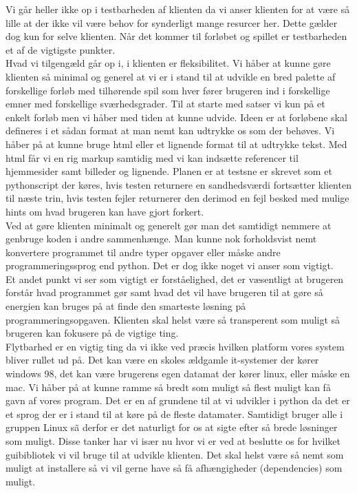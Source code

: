 \documentclass[10pt,a4paper,danish]{article}
\begin{document}
Vi går heller ikke op i testbarheden af klienten da vi anser klienten for at være så lille at der ikke vil være behov for synderligt mange resurcer her. Dette gælder dog kun for selve klienten. Når det kommer til forløbet og spillet er testbarheden et af de vigtigste punkter.
\\

Hvad vi tilgengæld går op i, i klienten er fleksibilitet. Vi håber at kunne gøre klienten så minimal og generel at vi er i stand til at udvikle en bred palette af forskellige forløb med tilhørende spil som hver fører brugeren ind i forskellige emner med forskellige sværhedsgrader. Til at starte med satser vi kun på et enkelt forløb men vi håber med tiden at kunne udvide. Ideen er at forløbene skal defineres i et sådan format at man nemt kan udtrykke os som der behøves. Vi håber på at kunne bruge html eller et lignende format til at udtrykke tekst. Med html får vi en rig markup samtidig med vi kan indsætte referencer til hjemmesider samt billeder og lignende. Planen er at testsne er skrevet som et pythonscript der køres, hvis testen returnere en sandhedsværdi fortsætter klienten til næste trin, hvis testen fejler returnerer den derimod en fejl besked med mulige hints om hvad brugeren kan have gjort forkert.
\\

Ved at gøre klienten minimalt og generelt gør man det samtidigt nemmere at genbruge koden i andre sammenhænge. Man kunne nok forholdsvist nemt konvertere programmet til andre typer opgaver eller måske andre programmeringssprog end python. Det er dog ikke noget vi anser som vigtigt.
\\

Et andet punkt vi ser som vigtigt er forståelighed, det er væsentligt at brugeren forstår hvad programmet gør samt hvad det vil have brugeren til at gøre så energien kan bruges på at finde den smarteste løsning på programmeringsopgaven.
Klienten skal helst være så transperent som muligt så brugeren kan fokusere på de vigtige ting.
\\

Flytbarhed er en vigtig ting da vi ikke ved præcis hvilken platform vores system bliver rullet ud på. Det kan være en skoles ældgamle it-systemer der kører windows 98, det kan være brugerens egen datamat der kører linux, eller måske en mac.
Vi håber på at kunne ramme så bredt som muligt så flest muligt kan få gavn af vores program. Det er en af grundene til at vi udvikler i python da det er et sprog der er i stand til at køre på de fleste datamater. Samtidigt bruger alle i gruppen Linux sã derfor er det naturligt for os at sigte efter så brede løsninger som muligt. Disse tanker har vi især nu hvor vi er ved at beslutte os for hvilket guibibliotek vi vil bruge til at udvikle klienten. Det skal helst være så nemt som muligt at installere så vi vil gerne have så få afhængigheder (dependencies) som muligt.
\\
\end{document}

